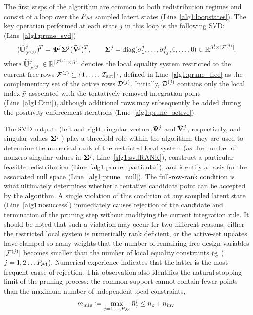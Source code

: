 \documentclass[preprint,10pt]{elsarticle}  %
\begin{document}
The first steps of the algorithm are common to both redistribution
regimes and consist of a loop over the \(P_{\mathcal{M}}\) sampled latent states
(Line~\ref{alg1:loopstates}). The key operation performed at each state $j$ in this loop
is the following  SVD:
(Line~\ref{alg1:prune_svd})
\begin{equation}
\label{eq:fullSVD}
({\widetilde{\mathbf{U}}^{j}}_{\mathcal{F}^{(j)}})^T
=
\boldsymbol{\Psi}^{j}\boldsymbol{\Sigma}^{j}(\mathbf{\bar{V}}^{j})^T,
\qquad
\boldsymbol{\Sigma}^{j}
=
\operatorname{diag}(\sigma_1^{j},\ldots,\sigma_{r_j}^{j},0,\ldots,0) \in
\mathbb{R}^{\bar{n}_c^{j}\times|\mathcal{F}^{(j)}|}.
\end{equation}
where
\(
{\widetilde{\mathbf{U}}^{j}}_{\mathcal{F}^{(j)}}
\in
\mathbb{R}^{|\mathcal{F}^{(j)}|\times\bar{n}_c^{j}}
\)
denotes the local equality system restricted to the current free rows
\(\mathcal{F}^{(j)}\subseteq\{1,\ldots,|\mathcal{I}_{\mathrm{act}}|\}\), defined in Line~\ref{alg1:prune_free} as the complementary set of the active rows $\mathcal{D}^{(j)}$. Initially, \(\mathcal{D}^{(j)}\) contains only the
local index \(\bar{p}\) associated with the tentatively removed
integration point (Line~\ref{alg1:Dini}), although additional rows may
subsequently be added during the positivity-enforcement iterations
(Line~\ref{alg1:prune_active}).

The SVD outputs (left and right singular vectors,$\boldsymbol{\Psi}^{j}$ and $\mathbf{\bar{V}}^{j}$, respectively, and singular values $\boldsymbol{\Sigma}^{j}$  ) play a threefold role within the algorithm: they are
used to determine the numerical rank of the restricted local system
(as the number of nonzero
singular values in \(\boldsymbol{\Sigma}^{j}\), Line~\ref{alg1:svdRANK}), construct a particular feasible
redistribution (Line~\ref{alg1:prune_particular}), and identify a basis
for the associated null space
(Line~\ref{alg1:prune_null}).  The full-row-rank condition is what ultimately determines whether a tentative
candidate point can be accepted by the algorithm. A single violation of this condition at any sampled latent state
(Line~\ref{alg1:nosuccess}) immediately causes rejection of the
candidate and termination of the pruning step without modifying the
current integration rule. It should be noted that such a violation may
occur for two different reasons: either the restricted local system is
numerically rank deficient, or the active-set updates have clamped so
many weights that the number of remaining free design variables  $|\mathcal{F}^{(j)}|$  becomes
smaller than the number of local equality constraints \(\bar{n}_c^{j}\) ($j=1,2 \ldots P_{\mathcal{M}}$).  Numerical experience indicates that the latter is the most frequent cause of rejection.  This observation also identifies the natural stopping limit of
the pruning process:  the common support cannot contain fewer points than the maximum number of independent local
constraints,
\begin{equation}
\label{eq:ncondmin}
m_{\textrm{min}} \mathrel{\mathop:}= \max_{j=1,\ldots,P_{\mathcal{M}}}\bar{n}_c^{j} \le n_c + n_{\mathrm{inv}}.
\end{equation}
\end{document}
